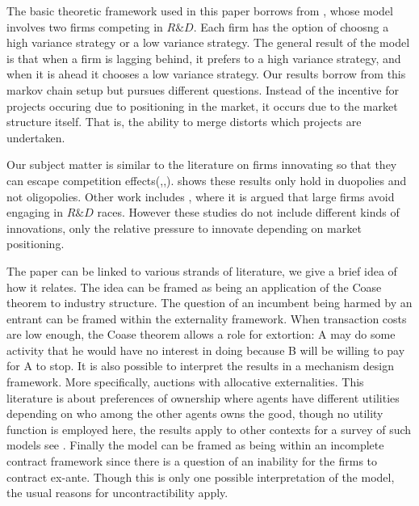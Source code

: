 


The basic theoretic framework used in this paper borrows from \cite{Cabral2003}, whose model involves two firms competing in $R\&D$. Each firm has the option of choosng a high variance strategy or a low variance strategy. The general result of the model is that when a firm is lagging behind, it prefers to a high variance strategy, and when it is ahead it chooses a low variance strategy. Our results borrow from this markov chain setup but pursues different questions. Instead of the incentive for projects occuring due to positioning in the market, it occurs due to the market structure itself. That is, the ability to merge distorts which projects are undertaken. 

Our subject matter is similar to the literature on firms innovating so that they can escape competition effects(\cite{Aghion2005},\cite{Aghion2001},\cite{Aghion1997}). \cite{Gilbert2016} shows these results only hold in duopolies and not oligopolies. Other work includes \cite{Phillips2012}, where it is argued that large firms avoid engaging in $R\&D$ races. However these studies do not include different kinds of innovations, only the relative pressure to innovate depending on market positioning. 

The paper can be linked to various strands of literature, we give a brief idea of how it relates. The idea can be framed as being an application of the Coase theorem to industry structure. The question of an incumbent being harmed by an entrant can be framed within the externality framework. When transaction costs are low enough, the Coase theorem allows a role for extortion: A may do some activity that he would have no interest in doing because B will be willing to pay for A to stop\citep{Kuechle2012}. It is also possible to interpret the results in a mechanism design framework. More specifically, auctions with allocative externalities. This literature is about preferences of ownership where agents have different utilities depending on who among the other agents owns the good, though no utility function is employed here, the results apply to other contexts for a survey of such models see \cite{Jehiel2005}. Finally the model can be framed as being within an incomplete contract framework since there is a question of an inability for the firms to contract ex-ante. Though this is only one possible interpretation of the model, the usual reasons for uncontractibility apply\citep{Hart1999}.

